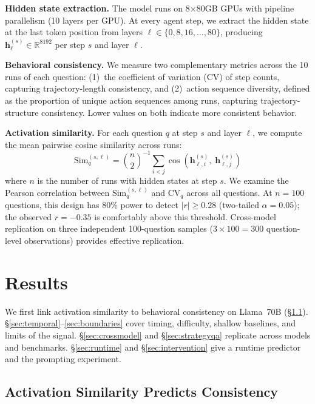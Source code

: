 \documentclass{article}
\begin{document}
\textbf{Hidden state extraction.} The model runs on 8$\times$80GB GPUs with pipeline parallelism (10 layers per GPU). At every agent step, we extract the hidden state at the last token position from layers $\ell \in \{0, 8, 16, \ldots, 80\}$, producing $\mathbf{h}_{\ell}^{(s)} \in \mathbb{R}^{8192}$ per step $s$ and layer $\ell$.

\textbf{Behavioral consistency.} We measure two complementary metrics across the 10 runs of each question: (1)~the coefficient of variation (CV) of step counts, capturing trajectory-length consistency, and (2)~action sequence diversity, defined as the proportion of unique action sequences among runs, capturing trajectory-structure consistency. Lower values on both indicate more consistent behavior.

\textbf{Activation similarity.} For each question $q$ at step $s$ and layer $\ell$, we compute the mean pairwise cosine similarity across runs:
\begin{equation}
\text{Sim}_q^{(s,\ell)} = \binom{n}{2}^{-1} \sum_{i < j} \cos\!\left(\mathbf{h}_{\ell,i}^{(s)},\; \mathbf{h}_{\ell,j}^{(s)}\right)
\end{equation}
where $n$ is the number of runs with hidden states at step $s$. We examine the Pearson correlation between $\text{Sim}_q^{(s,\ell)}$ and $\text{CV}_q$ across all questions. At $n{=}100$ questions, this design has 80\% power to detect $|r| \geq 0.28$ (two-tailed $\alpha = 0.05$); the observed $r = -0.35$ is comfortably above this threshold. Cross-model replication on three independent 100-question samples ($3 \times 100 = 300$ question-level observations) provides effective replication.

\section{Results}

We first link activation similarity to behavioral consistency on Llama~70B (\S\ref{sec:res-sim}). \S\ref{sec:temporal}--\ref{sec:boundaries} cover timing, difficulty, shallow baselines, and limits of the signal. \S\ref{sec:crossmodel} and \S\ref{sec:strategyqa} replicate across models and benchmarks. \S\ref{sec:runtime} and \S\ref{sec:intervention} give a runtime predictor and the prompting experiment.

\subsection{Activation Similarity Predicts Consistency}
\label{sec:res-sim}
\end{document}
